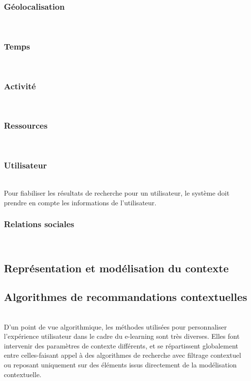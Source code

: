 \documentclass[conference]{./sty/IEEEtran}
\begin{document}
\subsubsection{Géolocalisation}
~\\

\subsubsection{Temps}
~\\

\subsubsection{Activité}
~\\

\subsubsection{Ressources}
~\\

\subsubsection{Utilisateur}
~\\
Pour fiabiliser les résultats de recherche pour un utilisateur, le système doit
prendre en compte les informations de l'utilisateur. \\

\subsubsection{Relations sociales}
~\\

\subsection{Représentation et modélisation du contexte}

\subsection{Algorithmes de recommandations contextuelles}
~\\D'un point de vue algorithmique, les méthodes utilisées pour personnaliser l'expérience utilisateur dans le cadre du e-learning sont très diverses. Elles font intervenir des paramètres de contexte différents, et se répartissent globalement entre celles-faisant appel à des algorithmes de recherche avec filtrage contextuel ou reposant uniquement sur des éléments issus directement de la modélisation contextuelle.
\end{document}
